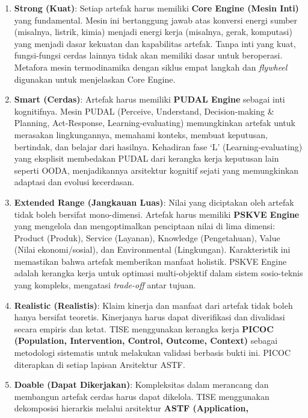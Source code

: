 \documentclass[
  letterpaper,
  DIV=11,
  numbers=noendperiod]{scrreprt}
\providecommand{\tightlist}{%
  \setlength{\itemsep}{0pt}\setlength{\parskip}{0pt}}
\begin{document}
\begin{enumerate}
\def\labelenumi{\arabic{enumi}.}
\tightlist
\item
  \textbf{Strong (Kuat)}: Setiap artefak harus memiliki \textbf{Core
  Engine (Mesin Inti)} yang fundamental. Mesin ini bertanggung jawab
  atas konversi energi sumber (misalnya, listrik, kimia) menjadi energi
  kerja (misalnya, gerak, komputasi) yang menjadi dasar kekuatan dan
  kapabilitas artefak. Tanpa inti yang kuat, fungsi-fungsi cerdas
  lainnya tidak akan memiliki dasar untuk beroperasi. Metafora mesin
  termodinamika dengan siklus empat langkah dan \emph{flywheel}
  digunakan untuk menjelaskan Core Engine.
\item
  \textbf{Smart (Cerdas)}: Artefak harus memiliki \textbf{PUDAL Engine}
  sebagai inti kognitifnya. Mesin PUDAL (Perceive, Understand,
  Decision-making \& Planning, Act-Response, Learning-evaluating)
  memungkinkan artefak untuk merasakan lingkungannya, memahami konteks,
  membuat keputusan, bertindak, dan belajar dari hasilnya. Kehadiran
  fase `L' (Learning-evaluating) yang eksplisit membedakan PUDAL dari
  kerangka kerja keputusan lain seperti OODA, menjadikannya arsitektur
  kognitif sejati yang memungkinkan adaptasi dan evolusi kecerdasan.
\item
  \textbf{Extended Range (Jangkauan Luas)}: Nilai yang diciptakan oleh
  artefak tidak boleh bersifat mono-dimensi. Artefak harus memiliki
  \textbf{PSKVE Engine} yang mengelola dan mengoptimalkan penciptaan
  nilai di lima dimensi: Product (Produk), Service (Layanan), Knowledge
  (Pengetahuan), Value (Nilai ekonomi/sosial), dan Environmental
  (Lingkungan). Karakteristik ini memastikan bahwa artefak memberikan
  manfaat holistik. PSKVE Engine adalah kerangka kerja untuk optimasi
  multi-objektif dalam sistem sosio-teknis yang kompleks, mengatasi
  \emph{trade-off} antar tujuan.
\item
  \textbf{Realistic (Realistis)}: Klaim kinerja dan manfaat dari artefak
  tidak boleh hanya bersifat teoretis. Kinerjanya harus dapat
  diverifikasi dan divalidasi secara empiris dan ketat. TISE menggunakan
  kerangka kerja \textbf{PICOC (Population, Intervention, Control,
  Outcome, Context)} sebagai metodologi sistematis untuk melakukan
  validasi berbasis bukti ini. PICOC diterapkan di setiap lapisan
  Arsitektur ASTF.
\item
  \textbf{Doable (Dapat Dikerjakan)}: Kompleksitas dalam merancang dan
  membangun artefak cerdas harus dapat dikelola. TISE menggunakan
  dekomposisi hierarkis melalui arsitektur \textbf{ASTF (Application,
}
\end{enumerate}
\end{document}
